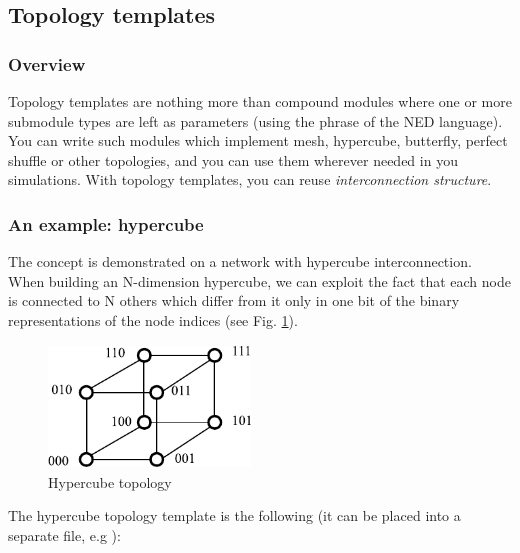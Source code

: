 \subsection{Topology templates}
\label{sec:ch-ned-lang:topology-templates}


\subsubsection{Overview}


Topology templates are nothing more than compound modules where one or
more submodule types are left as parameters (using the
 phrase of the NED language).  You can
write such modules which implement mesh,
hypercube,
butterfly, perfect
shuffle or other topologies, and you
can use them wherever needed in you simulations.  With topology
templates, you can reuse
\textit{interconnection structure}.



\subsubsection{An example: hypercube}


The concept is demonstrated on a network with hypercube interconnection.
When building an N-dimension hypercube, we can exploit the fact
that each node is connected to N others which differ from it
only in one bit of the binary representations of the node indices
(see Fig. \ref{fig:ch-ned-lang:hypercube-topology}).

\begin{figure}[htbp]
  \begin{center}
    \includegraphics[width=2.111in, height=1.285in]{figures/usmanFig8}
    \caption{Hypercube topology}
    \label{fig:ch-ned-lang:hypercube-topology}
  \end{center}
\end{figure}


The hypercube topology template is the
following (it can be placed into a separate file, e.g ):


